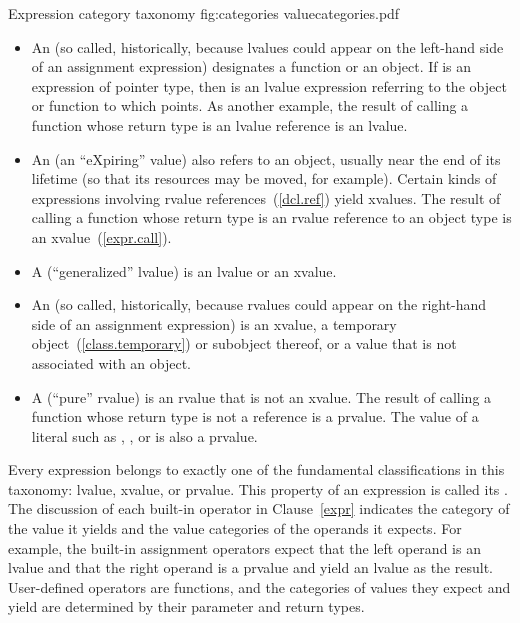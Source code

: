 \begin{importgraphic}
{Expression category taxonomy}
{fig:categories}
{valuecategories.pdf}
\end{importgraphic}

\begin{itemize}
\item An  (so called, historically, because lvalues could appear
on the left-hand side of an assignment expression) designates a function or an object.
\enterexample If  is an expression of pointer type, then  is
an lvalue expression referring to the object or function to which  points.
As another example, the result of calling a function whose return type is an
lvalue reference is an lvalue. \exitexample

\item An  (an ``eXpiring'' value) also refers to an object, usually near
the end of its lifetime (so that its resources may be moved, for example).
Certain kinds of expressions involving rvalue references~(\ref{dcl.ref}) yield xvalues.
\enterexample The result of calling a function whose return type is an rvalue reference
to an object type is an xvalue~(\ref{expr.call}). \exitexample

\item A  (``generalized'' lvalue) is an lvalue or an xvalue.

\item An  (so called, historically, because rvalues could appear
on the right-hand side of an assignment expression) is an xvalue, a temporary
object~(\ref{class.temporary}) or subobject thereof, or a value that is not
associated with an object.

\item A  (``pure'' rvalue) is an rvalue that is not an xvalue.
\enterexample The result of calling a function whose return type is not a reference
is a prvalue. The value of a literal such as , , or 
is also a prvalue. \exitexample
\end{itemize}

Every expression belongs to exactly one of the fundamental classifications in this
taxonomy: lvalue, xvalue, or prvalue. This property of an expression is called
its . \enternote The discussion of each built-in operator in
Clause~\ref{expr} indicates the category of the value it yields and the value categories
of the operands it expects. For example, the built-in assignment operators expect that
the left operand is an lvalue and that the right operand is a prvalue and yield an
lvalue as the result. User-defined operators are functions, and the categories of
values they expect and yield are determined by their parameter and return types. \exitnote

